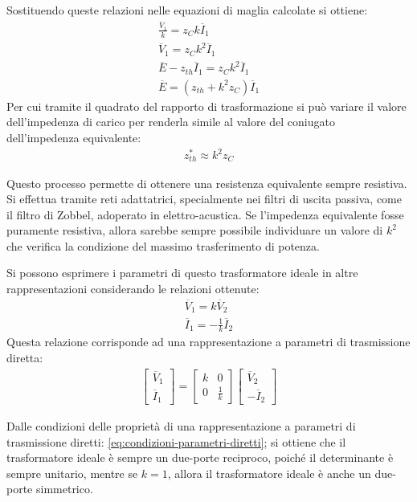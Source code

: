 \documentclass{article}
\numberwithin{equation}{subsection}
\begin{document}
Sostituendo queste relazioni nelle equazioni di maglia calcolate si ottiene:
\begin{gather*}
    \displaystyle\frac{\overline{V}_1}{k}=z_Ck\overline{I}_1\\
    \overline{V}_1=z_Ck^2\overline{I}_1\\
    \overline{E}-z_{th}\overline{I}_1=z_Ck^2\overline{I}_1\\
    \overline{E}=(z_{th}+k^2z_C)\overline{I}_1
\end{gather*}
Per cui tramite il quadrato del rapporto di trasformazione si può variare il valore dell'impedenza di carico per renderla simile al valore del coniugato dell'impedenza 
equivalente:
\begin{gather*}
    z_{th}^*\approx k^2z_C
\end{gather*}

Questo processo permette di ottenere una resistenza equivalente sempre resistiva. Si effettua tramite reti adattatrici, specialmente nei filtri di uscita passiva, come 
il filtro di Zobbel, adoperato in elettro-acustica. Se l'impedenza equivalente fosse puramente resistiva, allora sarebbe sempre possibile individuare un valore di $k^2$ che 
verifica la condizione del massimo trasferimento di potenza. 

Si possono esprimere i parametri di questo trasformatore ideale in altre rappresentazioni considerando le relazioni ottenute:
\begin{gather*}
    \overline{V}_1=k\overline{V}_2\\
    \overline{I}_1=-\displaystyle\frac{1}{k}\overline{I}_2
\end{gather*}
Questa relazione corrisponde ad una rappresentazione a parametri di trasmissione diretta:
\begin{gather*}
    \begin{bmatrix}
        \overline V_1\\ \overline I_1
    \end{bmatrix}=\begin{bmatrix}
        k&0\\0& \displaystyle\frac{1}{k}
    \end{bmatrix}\begin{bmatrix}
        \overline{V}_2\\ -\overline{I}_2
    \end{bmatrix}
\end{gather*}

Dalle condizioni delle proprietà di una rappresentazione a parametri di trasmissione diretti: \ref{eq:condizioni-parametri-diretti}; si ottiene che il trasformatore ideale è 
sempre un due-porte reciproco, poiché il determinante è sempre unitario, mentre se $k=1$, allora il trasformatore ideale è anche un due-porte simmetrico. 
\end{document}
